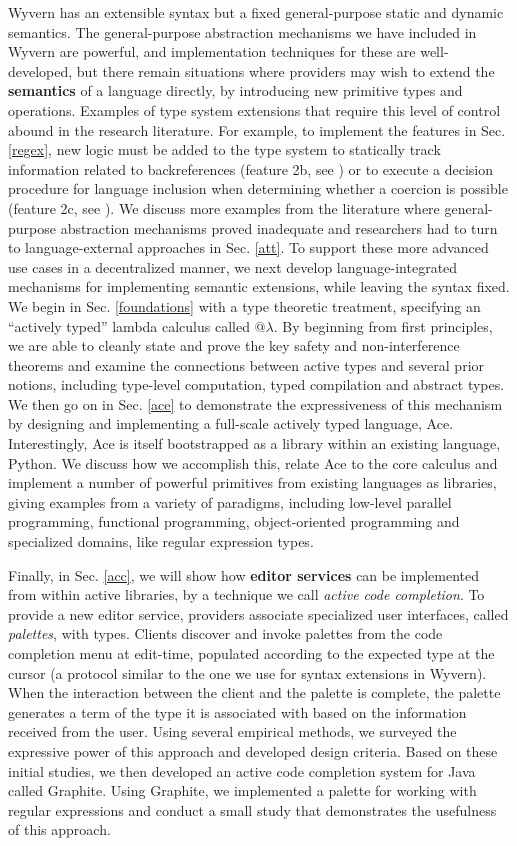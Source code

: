 Wyvern has an extensible syntax but a fixed general-purpose static and dynamic semantics. The general-purpose abstraction mechanisms we have included in Wyvern are powerful, and implementation techniques for these are well-developed, but there remain situations where providers may wish to extend the \textbf{semantics} of a language directly, by introducing new primitive types and operations. Examples of type system extensions that require this level of control abound in the research literature. For example, to implement the features in Sec. \ref{regex}, new logic must be added to the type system to statically track information related to backreferences (feature 2b, see \cite{spishak2012type}) or to execute a decision procedure for language inclusion when determining whether a coercion is possible (feature 2c, see \cite{fulton-thesis}). We discuss more examples from the literature where general-purpose abstraction mechanisms proved inadequate and researchers had to turn to language-external approaches in Sec. \ref{att}. To support these more advanced use cases in a decentralized manner, we next develop language-integrated mechanisms for implementing semantic extensions, while leaving the syntax fixed. We begin in Sec. \ref{foundations} with a type theoretic treatment, specifying an ``actively typed'' lambda calculus called @$\lambda$. By beginning from first principles, we are able to cleanly state and prove the key safety and non-interference theorems and examine the connections between active types and several prior notions, including type-level computation, typed compilation and abstract types. We then go on in Sec. \ref{ace} to demonstrate the expressiveness of this mechanism by designing and implementing a full-scale actively typed language, Ace. Interestingly, Ace is itself bootstrapped as a library within an existing language, Python. We discuss how we accomplish this, relate Ace to the core calculus and implement a number of powerful primitives from existing languages as libraries, giving examples from a variety of paradigms, including low-level parallel programming, functional programming, object-oriented programming and specialized domains, like regular expression types.

Finally, in Sec. \ref{acc}, we will show how \textbf{editor services} can be implemented from within active libraries, by a technique we call \emph{active code completion}. To provide a new editor service, providers associate
specialized user interfaces, called \emph{palettes}, with types. Clients discover and invoke palettes from the code completion menu at edit-time, populated according to the expected type at the cursor (a protocol similar to the one we use for syntax extensions in Wyvern). When the interaction between the client and the palette is complete, the palette generates a term of the type it is associated with based on the information received from the user. Using several empirical
methods, we surveyed the expressive power of this approach and developed design criteria. Based on these initial studies, we then developed an active code completion system for Java called Graphite. Using Graphite,
we implemented a palette for working with regular expressions and conduct a small study that demonstrates the usefulness of this approach.

